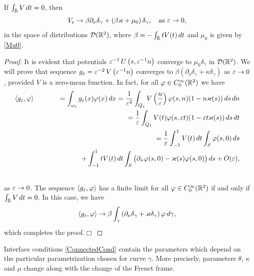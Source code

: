 \begin{proposition}\label{PropVepsConverg}
If $\int_\mathbb R V\,dt=0$, then
$$
   V_\varepsilon\to \beta\partial_\nu\delta_\gamma+\left(\beta\varkappa+\mu_0\right) \delta_\gamma,\quad \mbox{as } \varepsilon\to 0,
$$
in the space of distributions $\mathcal{D}(\mathbb R^2)$, where
$\beta=-\int_\mathbb R t V(t)\,dt$ and $\mu_0$ is given by \eqref{Mu0}.
\end{proposition}
\begin{proof}
It is evident that potentials $\varepsilon^{-1}\,U\left(s,\varepsilon^{-1}n\right)$
converge to $\mu_0 \delta_\gamma$ in $\mathcal{D}(\mathbb R^2)$.
We will prove that sequence $g_\varepsilon=\varepsilon^{-2}\,V\left(\varepsilon^{-1}n\right)$ converges to
$\beta\left(\partial_\nu\delta_\gamma+\kappa\delta_\gamma\right)$ as $\varepsilon\to 0$, provided $V$ is a zero-mean function.
  In fact, for all $\varphi\in C^\infty_0(\mathbb R^2)$ we have
\begin{eqnarray}\nonumber
\langle g_\varepsilon, \varphi \rangle&&=\int_{\omega_\varepsilon}g_\varepsilon(x)\varphi(x)\,dx
=
\frac{1}{\varepsilon^2}\int_{Q_\varepsilon} V\left(\frac{n}{\varepsilon}\right)\varphi(s,n)(1-n\varkappa(s))\,ds\,dn
\\\nonumber
&& =
\frac{1}{\varepsilon}\int_{Q_1} V(t)\varphi(s,\varepsilon t)(1-\varepsilon t\varkappa(s))\,ds\,dt
\\\nonumber
&&=\frac{1}{\varepsilon}\int_{-1}^1 V(t)\,dt \int_S\varphi(s,0)\,ds
\\\nonumber
&& \kern60pt
+
\int_{-1}^1 t V(t)\,dt \int_S\big(\partial_n\varphi(s,0)-\varkappa(s)\varphi(s,0)\big)\,ds+O(\varepsilon),
\\\nonumber
\end{eqnarray}
as $\varepsilon\to 0$.
The sequence $\langle g_\varepsilon, \varphi \rangle$ has a finite limit for all $\varphi\in C^\infty_0(\mathbb R^2)$ if and only if $\int_\mathbb R V\,dt=0$.
In this case, we have
$$
\langle g_\varepsilon, \varphi \rangle\to \beta\int_\gamma\left(\partial_\nu\delta_\gamma+\varkappa \delta_\gamma\right)\varphi\,d\gamma,
$$
which completes the proof.\hfill$\Box$
\end{proof}

Interface conditions \eqref{ConnectedCond} contain the parameters which depend on the particular parametrization chosen for curve $\gamma$. More precisely, parameters $\theta$, $\kappa$ and $\mu$ change along with the change of the Frenet frame.


